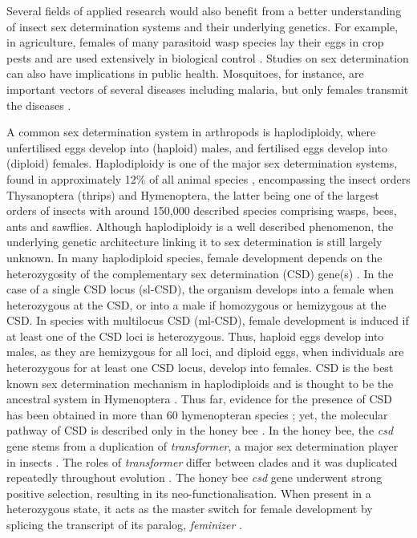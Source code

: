 \documentclass[11pt,a4paper]{report}
\begin{document}
Several fields of applied research would also benefit from a better understanding of insect sex determination systems and their underlying genetics. For example, in agriculture, females of many parasitoid wasp species lay their eggs in crop pests and are used extensively in biological control \citep{lasalle1993parasitic}. Studies on sex determination can also have implications in public health. Mosquitoes, for instance, are important vectors of several diseases including malaria, but only females transmit the diseases \citep{Krzywinska67}. 

A common sex determination system in arthropods is haplodiploidy, where unfertilised eggs develop into (haploid) males, and fertilised eggs develop into (diploid) females. Haplodiploidy is one of the major sex determination systems, found in approximately 12\% of all animal species \citep{Bachtrog2014SexIt}, encompassing the insect orders Thysanoptera (thrips) and Hymenoptera, the latter being one of the largest orders of insects with around 150,000 described species \citep{Mayhew2007WhyPhylogenies} comprising wasps, bees, ants and sawflies. Although haplodiploidy is a well described phenomenon, the underlying genetic architecture linking it to sex determination is still largely unknown. In many haplodiploid species, female development depends on the heterozygosity of the complementary sex determination (CSD) gene(s) \citep{Crozier1971}. In the case of a single CSD locus (sl-CSD), the organism develops into a female when heterozygous at the CSD, or into a male if homozygous or hemizygous at the CSD. In species with multilocus CSD (ml-CSD), female development is induced if at least one of the CSD loci is heterozygous. Thus, haploid eggs develop into males, as they are hemizygous for all loci, and diploid eggs, when individuals are heterozygous for at least one CSD locus, develop into females. CSD is the best known sex determination mechanism in haplodiploids and is thought to be the ancestral system in Hymenoptera \citep{Miyakawa2015}. Thus far, evidence for the presence of CSD has been obtained in more than 60 hymenopteran species \citep{VanWilgenburg2006}; yet, the molecular pathway of CSD is described only in the honey bee \citep{Beye2003}.  In the honey bee, the \textit{csd} gene stems from a duplication of \textit{transformer}, a major sex determination player in insects \citep{Bopp2014SexTheme}. The roles of \textit{transformer} differ between clades and it was duplicated repeatedly throughout evolution \citep{Privman2013}. The honey bee \textit{csd} gene underwent strong positive selection, resulting in its neo-functionalisation. When present in a heterozygous state, it acts as the master switch for female development by splicing the transcript of its paralog, \textit{feminizer} \citep{Hasselmann2008}.
\end{document}
